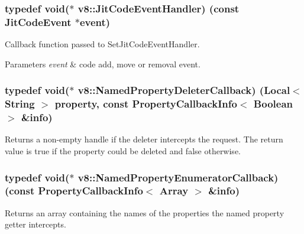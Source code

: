 \subsubsection[{\texorpdfstring{Jit\+Code\+Event\+Handler}{JitCodeEventHandler}}]{\setlength{\rightskip}{0pt plus 5cm}typedef void($\ast$ v8\+::\+Jit\+Code\+Event\+Handler) (const {\bf Jit\+Code\+Event} $\ast$event)}\hypertarget{namespacev8_a39243bc91e63d64d111452fdb98c4733}{}\label{namespacev8_a39243bc91e63d64d111452fdb98c4733}
Callback function passed to Set\+Jit\+Code\+Event\+Handler.


\begin{DoxyParams}{Parameters}
{\em event} & code add, move or removal event. \\
\hline
\end{DoxyParams}
\subsubsection[{\texorpdfstring{Named\+Property\+Deleter\+Callback}{NamedPropertyDeleterCallback}}]{\setlength{\rightskip}{0pt plus 5cm}typedef void($\ast$ v8\+::\+Named\+Property\+Deleter\+Callback) ({\bf Local}$<$ {\bf String} $>$ property, const {\bf Property\+Callback\+Info}$<$ {\bf Boolean} $>$ \&info)}\hypertarget{namespacev8_aaba861076c5b111912cfa0791d348437}{}\label{namespacev8_aaba861076c5b111912cfa0791d348437}
Returns a non-\/empty handle if the deleter intercepts the request. The return value is true if the property could be deleted and false otherwise. 
\subsubsection[{\texorpdfstring{Named\+Property\+Enumerator\+Callback}{NamedPropertyEnumeratorCallback}}]{\setlength{\rightskip}{0pt plus 5cm}typedef void($\ast$ v8\+::\+Named\+Property\+Enumerator\+Callback) (const {\bf Property\+Callback\+Info}$<$ {\bf Array} $>$ \&info)}\hypertarget{namespacev8_a5f6f16818a9cddacadbfe6d90ca3a6b1}{}\label{namespacev8_a5f6f16818a9cddacadbfe6d90ca3a6b1}
Returns an array containing the names of the properties the named property getter intercepts. 

